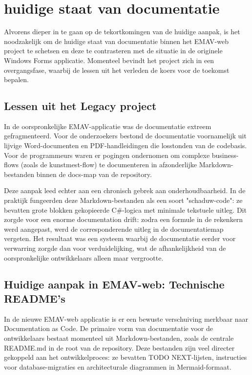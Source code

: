 \chapter{huidige staat van documentatie}
\label{ch:huidige_staat_documentatie}

Alvorens dieper in te gaan op de tekortkomingen van de huidige aanpak, is het noodzakelijk om de huidige staat van documentatie binnen het EMAV-web project te schetsen en deze te contrasteren met de situatie in de originele Windows Forms applicatie. Momenteel bevindt het project zich in een overgangsfase, waarbij de lessen uit het verleden de koers voor de toekomst bepalen.

\section{Lessen uit het Legacy project}
{\sloppy In de oorspronkelijke EMAV-applicatie was de documentatie extreem gefragmenteerd. Voor de onderzoekers bestond de documentatie voornamelijk uit lijvige Word-documenten en PDF-handleidingen die losstonden van de codebasis. Voor de programmeurs waren er pogingen ondernomen om complexe business-flows (zoals de kunstmest-flow) te documenteren in afzonderlijke Markdown-bestanden binnen de docs-map van de repository.\par}

Deze aanpak leed echter aan een chronisch gebrek aan onderhoudbaarheid. In de praktijk fungeerden deze Markdown-bestanden als een soort "schaduw-code": ze bevatten grote blokken gekopieerde C\#-logica met minimale tekstuele uitleg. Dit zorgde voor een enorme documentation drift: zodra een formule in de rekenkern werd aangepast, werd de corresponderende uitleg in de documentatiemap vergeten. Het resultaat was een systeem waarbij de documentatie eerder voor verwarring zorgde dan voor verduidelijking, wat de afhankelijkheid van de oorspronkelijke ontwikkelaars alleen maar vergrootte.

\section{Huidige aanpak in EMAV-web: Technische README's}
In de nieuwe EMAV-web applicatie is er een bewuste verschuiving merkbaar naar Documentation as Code. De primaire vorm van documentatie voor de ontwikkelaars bestaat momenteel uit Markdown-bestanden, zoals de centrale README.md in de root van de repository. Deze bestanden zijn veel directer gekoppeld aan het ontwikkelproces: ze bevatten TODO NEXT-lijsten, instructies voor database-migraties en architecturale diagrammen in Mermaid-formaat.

